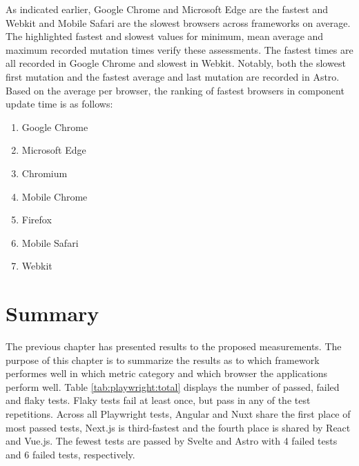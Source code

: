 \documentclass[a4paper, 12pt]{article}
\begin{document}
As indicated earlier, Google Chrome and Microsoft Edge are the fastest and Webkit and Mobile Safari are the slowest browsers across frameworks on average.
The highlighted fastest and slowest values for minimum, mean average and maximum recorded mutation times verify these assessments.
The fastest times are all recorded in Google Chrome and slowest in Webkit.
Notably, both the slowest first mutation and the fastest average and last mutation are recorded in Astro.
Based on the average per browser, the ranking of fastest browsers in component update time is as follows:

\begin{enumerate}
  \item Google Chrome
  \item Microsoft Edge
  \item Chromium
  \item Mobile Chrome
  \item Firefox
  \item Mobile Safari
  \item Webkit
\end{enumerate}

\section{Summary}\label{sec:summary}

The previous chapter has presented results to the proposed measurements.
The purpose of this chapter is to summarize the results as to which framework performes well in which metric category and which browser the applications perform well.
Table \ref{tab:playwright:total} displays the number of passed, failed and flaky tests.
Flaky tests fail at least once, but pass in any of the test repetitions.
Across all Playwright tests, Angular and Nuxt share the first place of most passed tests, Next.js is third-fastest and the fourth place is shared by React and Vue.js.
The fewest tests are passed by Svelte and Astro with 4 failed tests and 6 failed tests, respectively.
\end{document}
